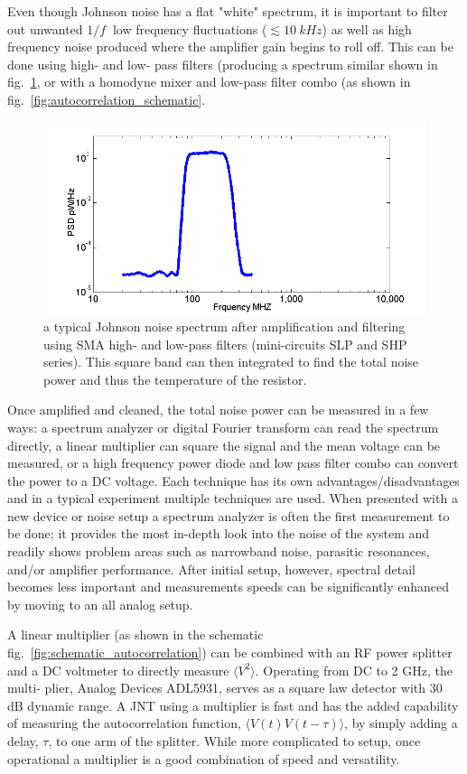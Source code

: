 Even though Johnson noise has a flat "white" spectrum, it is important to filter out unwanted $1/f~$ low frequency fluctuations ($\lesssim 10~kHz$) as well as high frequency noise produced where the amplifier gain begins to roll off. 
This can be done using high- and low- pass filters (producing a spectrum similar shown in fig.~\ref{fig:Miteq_BP_spec}, or with a homodyne mixer and low-pass filter combo (as shown in fig.~\ref{fig:autocorrelation_schematic}. 
\begin{figure}
\includegraphics[width=\textwidth]{figures/Johnson_noise_thermometry/Miteq_BP_spec.png}
\caption{a typical Johnson noise spectrum after amplification and filtering using SMA high- and low-pass filters (mini-circuits SLP and SHP series). This square band can then integrated to find the total noise power and thus the temperature of the resistor.}
\label{fig:Miteq_BP_spec}
\end{figure}

Once amplified and cleaned, the total noise power can be measured in a few ways: a spectrum analyzer or digital Fourier transform can read the spectrum directly, a linear multiplier can square the signal and the mean voltage can be measured, or a high frequency power diode and low pass filter combo can convert the power to a DC voltage. Each technique has its own advantages/disadvantages and in a typical experiment multiple techniques are used. 
When presented with a new device or noise setup a spectrum analyzer is often the first measurement to be done; it provides the most in-depth look into the noise of the system and readily shows problem areas such as narrowband noise, parasitic resonances, and/or amplifier performance. After initial setup, however, spectral detail becomes less important and measurements speeds can be significantly enhanced by moving to an all analog setup. 

A linear multiplier (as shown in the schematic fig.~\ref{fig:schematic_autocorrelation}) can be combined with an RF power splitter and a DC voltmeter to directly measure $\langle V^2\rangle$. Operating from DC to 2 GHz, the multi-
plier, Analog Devices ADL5931, serves as a square law
detector with 30 dB dynamic range. A JNT using a multiplier is fast and has the added capability of measuring the autocorrelation function, $\langle V(t)V(t-\tau)\rangle$, by simply adding a delay, $\tau$, to one arm of the splitter. While more complicated to setup, once operational a multiplier is a good combination of speed and versatility.

